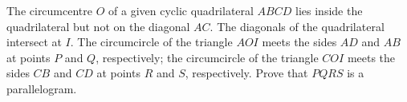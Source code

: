 The circumcentre $O$ of a given cyclic quadrilateral $ABCD$ lies inside the quadrilateral but not on the diagonal $AC$.  The diagonals of the quadrilateral intersect at $I$.  The circumcircle of the triangle $AOI$ meets the sides $AD$ and $AB$ at points $P$ and $Q$,  respectively; the circumcircle of the triangle $COI$ meets the sides $CB$ and $CD$ at points $R$ and $S$,  respectively.  Prove that $PQRS$ is a parallelogram.